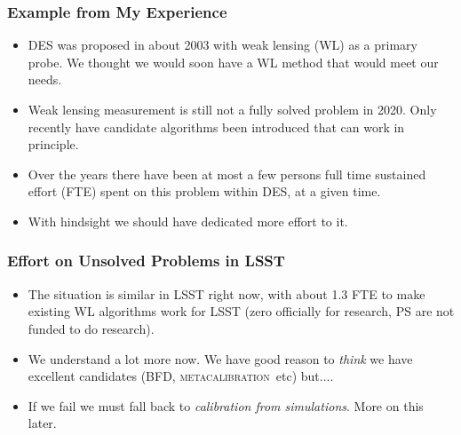 \documentclass{beamer}
\newcommand{\mcal}{\textsc{metacalibration}}
\begin{document}
\frame
{
    \frametitle{Example from My Experience}


    \begin{itemize}

        \item DES was proposed in about 2003 with weak lensing (WL) as a primary
            probe.  We thought we would soon have a WL method that
            would meet our needs.

        \item Weak lensing measurement is still not a fully solved problem in
            2020.  Only recently have candidate algorithms been introduced that
            can work in principle.


        \item  Over the years there have been at most a few persons full time
            sustained effort (FTE) spent on this problem within DES, at a given
            time.

        \item With hindsight we should have dedicated more effort to it.


    \end{itemize}

}
\frame
{
    \frametitle{Effort on Unsolved Problems in LSST}


    \begin{itemize}

        \item The situation is similar in LSST right now, with about 1.3
            FTE to make existing WL algorithms work for LSST (zero officially for
            research, PS are not funded to do research).

        \item We understand a lot more now.  We have good reason to {\em think}
            we have excellent candidates (BFD, \mcal\ etc) but....

        \item If we fail we must fall back to {\em calibration from simulations}.  More
            on this later.

    \end{itemize}

}
\end{document}
